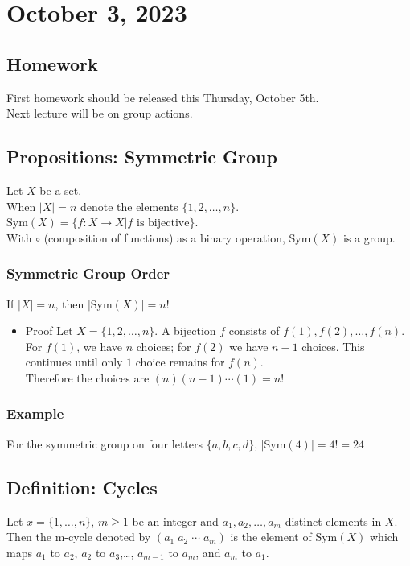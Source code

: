 \documentclass[11pt]{article}
\newcommand{\0}{\emptyset}
\begin{document}
\section*{October 3, 2023}
\label{sec:org5672737}
\subsection*{Homework}
\label{sec:orgd0febe8}
First homework should be released this Thursday, October 5th.\\[0pt]
Next lecture will be on group actions.\\[0pt]
\subsection*{Propositions: Symmetric Group}
\label{sec:org57883f6}
Let \(X\) be a set.\\[0pt]
When \(|X|=n\) denote the elements \(\{1,2,\ldots,n\}\).\\[0pt]
\(\text{Sym}(X)=\{f:X\to X|f\text{ is bijective}\}\).\\[0pt]
With \(\circ\) (composition of functions) as a binary operation, \(\text{Sym}(X)\) is a group.\\[0pt]
\subsubsection*{Symmetric Group Order}
\label{sec:org64c8ca9}
If \(|X|=n\), then \(|\text{Sym}(X)|=n!\)\\[0pt]
\begin{itemize}
\item Proof
\label{sec:org2b12864}
Let \(X=\{1,2,\ldots,n\}\). A bijection \(f\) consists of \(f(1),f(2),\ldots,f(n)\).\\[0pt]
For \(f(1)\), we have \(n\) choices; for \(f(2)\) we have \(n-1\) choices. This continues until only \(1\) choice remains for \(f(n)\).\\[0pt]
Therefore the choices are \((n)(n-1)\cdots(1)=n!\)\\[0pt]
\end{itemize}
\subsubsection*{Example}
\label{sec:org1f193df}
For the symmetric group on four letters \(\{a,b,c,d\}\), \(|\text{Sym}(4)|=4!=24\)\\[0pt]
\subsection*{Definition: Cycles}
\label{sec:orgd8b73aa}
Let \(x=\{1,\ldots,n\}\), \(m\geq1\) be an integer and \(a_{1},a_{2},\ldots,a_{m}\) distinct elements in \(X\).\\[0pt]
Then the m-cycle denoted by \((a_{1}\;a_{2}\;\cdots\;a_{m})\) is the element of \(\text{Sym}(X)\) which maps \(a_{1}\) to \(a_{2}\), \(a_{2}\) to \(a_{3}\),\ldots{}, \(a_{m-1}\) to \(a_{m}\), and \(a_{m}\) to \(a_{1}\).\\[0pt]
\end{document}
